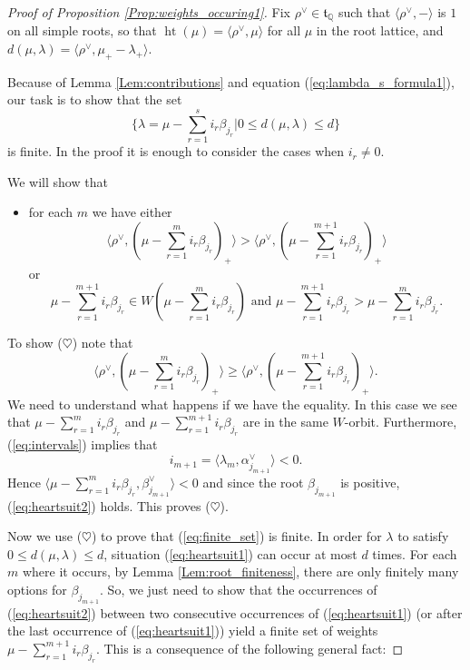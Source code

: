 \documentclass{amsart}
\theoremstyle{definition}
\numberwithin{equation}{section}
\begin{document}
\begin{proof}[Proof of Proposition \ref{Prop:weights_occuring1}]
Fix $\rho^\vee\in \mathfrak{t}_{\mathbb{Q}}$ such that $\langle\rho^\vee,-\rangle$ is $1$ on all simple roots, so that $\operatorname{ht}(\mu)=\langle\rho^\vee,\mu\rangle$ for all $\mu$ in the root lattice, and $d(\mu,\lambda)=\langle\rho^\vee,\mu_+-\lambda_+\rangle$.

Because of Lemma \ref{Lem:contributions} and equation (\ref{eq:lambda_s_formula1}), our task is to show that the set
\begin{equation}\label{eq:finite_set}
\{\lambda=\mu-\sum_{r=1}^s i_r\beta_{j_r}| 0\leqslant d(\mu,\lambda)\leqslant d\}
\end{equation}
is finite.
In the proof it is enough to consider the cases when $i_r\neq 0$.

We will show that
\begin{itemize}
\item[($\heartsuit$)]
for each $m$ we have either
\begin{equation}\label{eq:heartsuit1}
\langle\rho^\vee,(\mu-\sum_{r=1}^{m}i_r\beta_{j_r})_+\rangle>
\langle\rho^\vee,(\mu-\sum_{r=1}^{m+1}i_r\beta_{j_r})_+\rangle\end{equation}
or
\begin{equation}\label{eq:heartsuit2}
\mu-\sum_{r=1}^{m+1}i_r\beta_{j_r}\in W(\mu-\sum_{r=1}^m i_r\beta_{j_r}) \text{ and }\mu-\sum_{r=1}^{m+1}i_r\beta_{j_r}>\mu-\sum_{r=1}^m i_r\beta_{j_r}.
\end{equation}
\end{itemize}
To show ($\heartsuit$) note that
$$\langle\rho^\vee, (\mu-\sum_{r=1}^{m}i_r\beta_{j_r})_+\rangle\geqslant
\langle\rho^\vee, (\mu-\sum_{r=1}^{m+1}i_r\beta_{j_r})_+\rangle.$$
We need to understand what happens if we have the equality. In this case we see that
 $\mu-\sum_{r=1}^{m}i_r\beta_{j_r}$ and $\mu-\sum_{r=1}^{m+1}i_r\beta_{j_r}$ are in the same $W$-orbit. Furthermore, (\ref{eq:intervals}) implies that
\[
i_{m+1}=\langle\lambda_m, \alpha_{j_{m+1}}^\vee\rangle<0.
\]
Hence $\langle\mu-\sum_{r=1}^m i_r \beta_{j_r},\beta_{j_{m+1}}^\vee\rangle<0$ and since the root $\beta_{j_{m+1}}$ is positive, (\ref{eq:heartsuit2}) holds. This proves ($\heartsuit$).

Now we use ($\heartsuit$) to prove that (\ref{eq:finite_set}) is finite. In order for $\lambda$ to satisfy $0\leqslant d(\mu,\lambda)\leqslant d$, situation (\ref{eq:heartsuit1}) can occur at most $d$ times. For each $m$ where it occurs, by Lemma \ref{Lem:root_finiteness}, there are only finitely many options for $\beta_{j_{m+1}}$. So, we just need to show that the occurrences of (\ref{eq:heartsuit2}) between two consecutive occurrences of (\ref{eq:heartsuit1}) (or after the last occurrence of (\ref{eq:heartsuit1})) yield a finite set of weights   $\mu-\sum_{r=1}^{m+1}i_r\beta_{j_r}$. This is a consequence of the following general fact: 


\end{proof}
\end{document}
